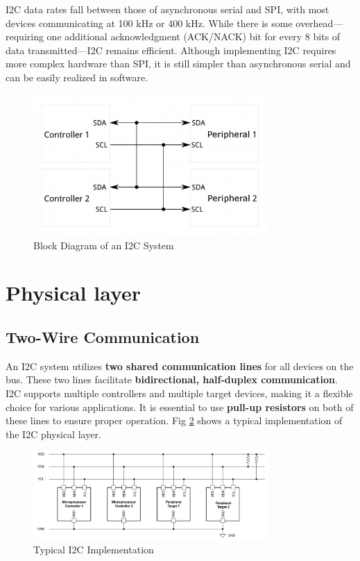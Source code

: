 \documentclass[a4paper,12pt]{report}
\begin{document}
\vspace{0.25in}

I2C data rates fall between those of asynchronous serial and SPI, with most devices communicating at 100 kHz or 400 kHz. While there is some overhead—requiring one additional acknowledgment (ACK/NACK) bit for every 8 bits of data transmitted—I2C remains efficient. Although implementing I2C requires more complex hardware than SPI, it is still simpler than asynchronous serial and can be easily realized in software.

\begin{figure}[htbp]
    \centering
    \includegraphics[width=0.8\textwidth]{i2c_block_diagram.png} %
    \caption{Block Diagram of an I2C System}
    \label{fig:i2c_block_diagram}
\end{figure}


\newpage 

\section{Physical layer}
\subsection{Two-Wire Communication}

An I2C system utilizes \textbf{two shared communication lines} for all devices on the bus. These two lines facilitate \textbf{bidirectional, half-duplex communication}. I2C supports multiple controllers and multiple target devices, making it a flexible choice for various applications. It is essential to use \textbf{pull-up resistors} on both of these lines to ensure proper operation. Fig \ref{fig:i2c_implementation} shows a typical implementation of the I2C physical layer.
\vspace{0.25in}
\begin{figure}[htbp]
    \centering
    \includegraphics[width=0.8\textwidth]{i2c_physical_layer.png} %
    \caption{Typical I2C Implementation}
    \label{fig:i2c_implementation}
\end{figure}
\end{document}
